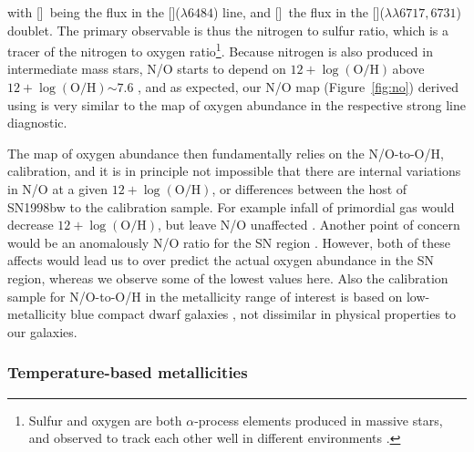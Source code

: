 \documentclass[traditabstract]{aa}
\newcommand{\oh}{$12+\log(\mathrm{O/H})$}
\newcommand{\sii}{[\ion{S}{ii}]}
\newcommand{\nii}{[\ion{N}{ii}]}
\begin{document}
with \nii\, being the flux in the \nii($\lambda6484$) line, and \sii\, the flux in the \sii($\lambda\lambda6717,6731$) doublet. The primary observable is thus the nitrogen to sulfur ratio, which is a tracer of the nitrogen to oxygen ratio\footnote{Sulfur and oxygen are both $\alpha$-process elements produced in massive stars, and observed to track each other well in different environments \citep[see e.g., Figure 6 in][]{2006A&A...448..955I}.}. Because nitrogen is also produced in intermediate mass stars, N/O starts to depend on \oh\,above \oh$\sim 7.6$ \citep[e.g.][]{1999ApJ...511..639I, 2013A&A...549A..25P}, and as expected, our N/O map (Figure~\ref{fig:no}) derived using \citet{2010ApJ...715L.128A} is very similar to the map of oxygen abundance in the respective strong line diagnostic. 

The map of oxygen abundance then fundamentally relies on the N/O-to-O/H, calibration, and it is in principle not impossible that there are internal variations in N/O at a given \oh, or differences between the host of SN1998bw to the calibration sample. For example infall of primordial gas would decrease \oh, but leave N/O unaffected \citep{2016ApJ...823L..24K}. Another point of concern would be an anomalously N/O ratio for the SN region \citep{2006A&A...454..103H}. However, both of these affects would lead us to over predict the actual oxygen abundance in the SN region, whereas we observe some of the lowest values here. Also the calibration sample for N/O-to-O/H in the metallicity range of interest is based on low-metallicity blue compact dwarf galaxies \citep{1999ApJ...511..639I}, not dissimilar in physical properties to our galaxies. %

\subsubsection{Temperature-based metallicities}
\end{document}
